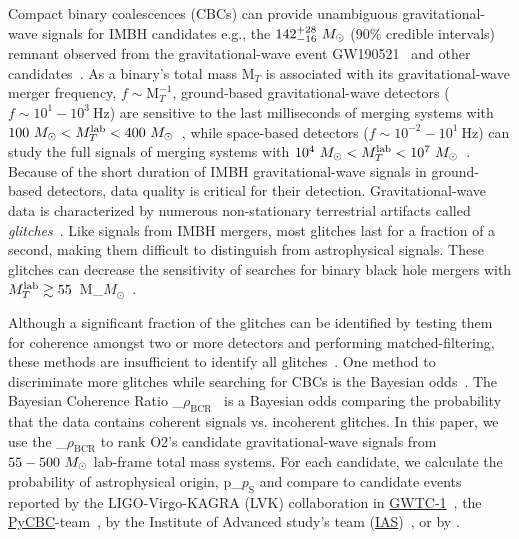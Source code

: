 \documentclass[
 nofootinbib,
 amsmath,amssymb,
 aps,
 twocolumn,
 superscriptaddress
]{revtex4-2}
\newcommand{\pycbc}{{\sc \href{https://pycbc.org/}{{PyCBC}}}\xspace}
\newcommand{\GWTC}{{\sc \href{https://ui.adsabs.harvard.edu/abs/2019PhRvX...9c1040A/abstract}{{GWTC-1}}}\xspace}
\newcommand{\IAS}{{\sc \href{https://ui.adsabs.harvard.edu/abs/2020PhRvD.101h3030V/abstract}{{IAS}}}\xspace}
\newcommand{\fancytext}[1]{{\relax\ifmmode#1\else $#1$\fi}\xspace}
\newcommand{\mathcmd}[1]{{\sc \relax\ifmmode#1\else $#1$\fi}\xspace}
\newcommand{\bcr}{\mathcmd{\rho_\text{BCR}}}
\newcommand{\msun}{\mathcmd{M_\odot}}
\newcommand{\totMlab}{\mathcmd{M_T^{\rm{lab}}}}
\newcommand{\pastrobcr}{\fancytext{p_\text{S}}}
\begin{document}
Compact binary coalescences (CBCs) can provide unambiguous gravitational-wave signals for IMBH candidates e.g., the $142^{+28}_{-16}~\msun$ ($90\%$ credible intervals) remnant observed from the gravitational-wave event GW190521~\cite{Abbott:2020:PhRvL} and other candidates~\cite{ligo_imbh_search, ligo_imbh_o3, pycbc_imbh}. As a binary's total mass $\text{M}_{T}$ is associated with its gravitational-wave merger frequency, $f\sim \text{M}_{T}^{-1}$,  ground-based gravitational-wave detectors ($f\sim 10^1 - 10^3\ \text{Hz}$) are sensitive to the last milliseconds of merging systems with $100~\msun < \totMlab < 400~\msun$~\cite{LIGOScientificCollaboration:2015:CQGra, Martynov:2016:PhRvD, Moore_2014, Acernese:2015:CQGra}, while space-based detectors ($f \sim 10^{-2} - 10^1\ \text{Hz}$) can study the full signals of merging systems with $10^4~\msun < \totMlab < 10^7~\msun$~\cite{ Moore_2014, Lu:2019:PhRvD}. Because of the short duration of IMBH gravitational-wave signals in ground-based detectors, data quality is critical for their detection. Gravitational-wave data is characterized by numerous non-stationary terrestrial artifacts called \textit{glitches}~\cite{ pycbc_short_duration_transients, pe_with_glitch, blip_glitches}. Like signals from IMBH mergers, most glitches last for a fraction of a second, making them difficult to distinguish from astrophysical signals. These glitches can decrease the sensitivity of searches for binary black hole mergers with $\totMlab\gtrsim55$~\msun ~\cite{pycbc_short_duration_transients}.

Although a significant fraction of the glitches can be identified by testing them for coherence amongst two or more detectors and performing matched-filtering, these methods are insufficient to identify all glitches~\cite{ pycbc_short_duration_transients, pe_with_glitch, blip_glitches}. One method to discriminate more glitches while searching for CBCs is the Bayesian odds~\cite{bci, kanner2016leveraging, BCR1, BCR2, bcr_gw151216, bayesian_odds}. The Bayesian Coherence Ratio \bcr~\cite{BCR1,BCR2} is a Bayesian odds comparing the probability that the data contains coherent signals vs. incoherent glitches. In this paper, we use the \bcr to rank O2's candidate gravitational-wave signals from $55-500~\msun$ lab-frame total mass systems. For each candidate, we calculate the probability of astrophysical origin, \pastrobcr and compare to candidate events reported by the LIGO-Virgo-KAGRA (LVK) collaboration in \GWTC~\cite{GWTC1}, the \pycbc-team~\cite{pycbc_code, pycbc_og0, pycbc_og1, pycbc_og2, pycbc_og3, pycbc_og4, pycbc_og5, pycbc_og6, pycbc_single_det, pycbc_ogc_2}, by the Institute of Advanced study's team (\IAS)~\cite{IAS0, IAS1, IAS2}, or by \citet{bayesian_odds}. 
\end{document}
